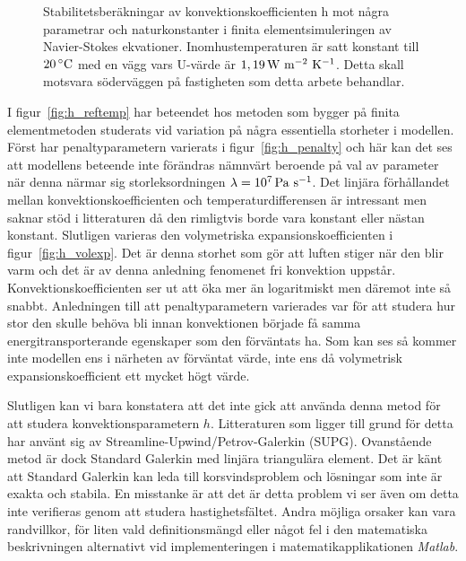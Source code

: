 \begin{figure}[hpbt]
\caption{\label{fig:konv_param}Stabilitets\-beräkningar av konvektions\-koefficienten h mot några
parametrar och natur\-konstanter i finita element\-simuleringen av Navier-Stokes ekvationer.
Inomhus\-temperaturen är satt konstant till $\unit[20]{^\circ C}$ med en vägg vars U-värde är
$\unit[1,19]{ W~m^{-2}~K^{-1}}$. Detta skall motsvara söder\-väggen på fastigheten som detta arbete behandlar.}

\end{figure}

I figur~\ref{fig:h_reftemp} har beteendet hos metoden som bygger på finita elementmetoden studerats vid variation på några essentiella storheter i modellen.
Först har penaltyparametern varierats i figur~\ref{fig:h_penalty} och här kan det ses att modellens beteende inte förändras nämnvärt
beroende på val av parameter när denna närmar sig storleksordningen $\lambda = \unit[10^7]{Pa~s^{-1}}$. Det linjära förhållandet mellan
konvektionskoefficienten och temperaturdifferensen är intressant men saknar stöd i litteraturen då den rimligtvis borde vara
konstant eller nästan konstant. Slutligen varieras den volymetriska expansionskoefficienten
i figur~\ref{fig:h_volexp}. Det är denna storhet
som gör att luften stiger när den blir varm och det är av denna anledning fenomenet fri konvektion uppstår. Konvektionskoefficienten
ser ut att öka mer än logaritmiskt men däremot inte så snabbt. Anledningen till att penaltyparametern varierades var för
att studera hur stor den skulle behöva bli innan konvektionen började få samma energitransporterande egenskaper
som den förväntats ha. Som kan ses så kommer inte modellen ens i närheten av förväntat värde, inte ens då volymetrisk expansionskoefficient ett mycket högt värde.

Slutligen kan vi bara konstatera att det inte gick att använda denna metod för att studera konvektionsparametern $h$. Litteraturen
som ligger till grund för detta har använt sig av Streamline-Upwind/Petrov-Galerkin (SUPG)\cite{heinrich88}\cite{roy05}. Ovanstående metod är dock
Standard Galerkin med linjära triangulära element. Det är känt att Standard Galerkin kan leda till korsvindsproblem och lösningar som inte är
exakta och stabila\cite{segal2011}.
En misstanke är att det är detta problem vi ser även om detta inte verifieras genom att studera hastighetsfältet. Andra
möjliga orsaker kan vara randvillkor, för liten vald definitionsmängd eller något fel i den matematiska beskrivningen alternativt
vid implementeringen i matematikapplikationen \emph{Matlab}.
